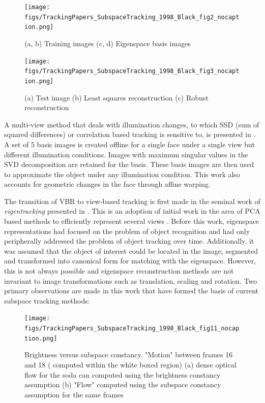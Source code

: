 								\begin{figure}[t]
								\center
								\texttt{[image: figs/TrackingPapers\_SubspaceTracking\_1998\_Black\_fig2\_nocaption.png]}
								\caption{(a, b) Training images (c, d) Eigenspace basis images \cite{1998_JNL_Eigentracking_Black}}
								\end{figure}


								\begin{figure}
								\center
								\texttt{[image: figs/TrackingPapers\_SubspaceTracking\_1998\_Black\_fig3\_nocaption.png]}
								\caption{(a) Test image (b) Least squares reconstruction (c) Robust reconstruction \cite{1998_JNL_Eigentracking_Black}}
								\end{figure}

A multi-view method that deals with illumination changes, to which SSD (sum of squared differences) or correlation based tracking is sensitive to, is presented in \cite{1996_TRK_region_Hager}.  A set of 5 basis images is created offline for a single face under a single view but different illumination conditions.  Images with maximum singular values in the SVD decomposition are retained for the basis.  These basis images are then used to approximate the object under any illumination condition.  This work also accounts for geometric changes in the face through affine warping.  

The transition of VBR to view-based tracking is first made in the seminal work of \emph{eigentracking} presented in \cite{1998_JNL_Eigentracking_Black}.  This is an adoption of initial work in the area of PCA based methods to efficiently represent several views \cite{1995_JNL_ActiveModels_Cootes, 1991_CNF_Eigenfaces_Turk}.  Before this work, eigenspace representations had focused on the problem of object recognition and had only peripherally addressed the problem of object tracking over time.  Additionally, it was assumed that the object of interest could be located in the image, segmented and transformed into canonical form for matching with the eigenspace.  However, this is not always possible and eigenspace reconstruction methods are not invariant to image transformations such as translation, scaling and rotation.  Two primary observations are made in this work that have formed the basis of current subspace tracking methods:

								\begin{figure}[t]
								\center
								\texttt{[image: figs/TrackingPapers\_SubspaceTracking\_1998\_Black\_fig11\_nocaption.png]}
								\caption{Brightness versus subspace constancy.  "Motion" between frames 16 and 18 ( computed within the white boxed region) (a) dense optical flow for the soda can computed using the brightness constancy assumption (b) "Flow" computed using the subspace constancy assumption for the same frames \cite{1998_JNL_Eigentracking_Black}}
								\end{figure}


